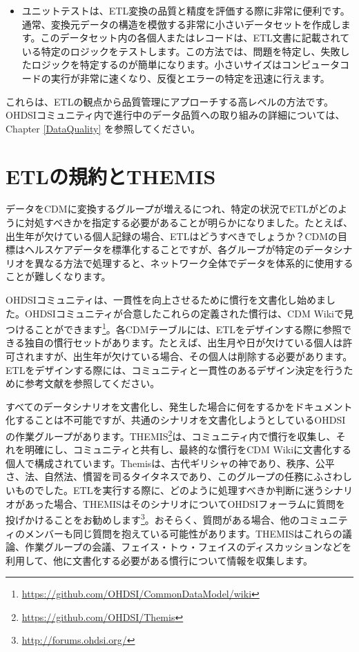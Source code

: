 \documentclass[
  11pt]{book}
\providecommand{\tightlist}{%
  \setlength{\itemsep}{0pt}\setlength{\parskip}{0pt}}
\theoremstyle{definition}
\theoremstyle{definition}
\theoremstyle{definition}
\theoremstyle{definition}
\theoremstyle{remark}
\begin{document}
\begin{itemize}
  \begin{itemize}
  \tightlist
  \item
    ユニットテストは、ETL変換の品質と精度を評価する際に非常に便利です。通常、変換元データの構造を模倣する非常に小さいデータセットを作成します。このデータセット内の各個人またはレコードは、ETL文書に記載されている特定のロジックをテストします。この方法では、問題を特定し、失敗したロジックを特定するのが簡単になります。小さいサイズはコンピュータコードの実行が非常に速くなり、反復とエラーの特定を迅速に行えます。
  \end{itemize}
\end{itemize}

これらは、ETLの観点から品質管理にアプローチする高レベルの方法です。OHDSIコミュニティ内で進行中のデータ品質への取り組みの詳細については、Chapter \ref{DataQuality} を参照してください。

\section{ETLの規約とTHEMIS}\label{etlux306eux898fux7d04ux3068themis}

データをCDMに変換するグループが増えるにつれ、特定の状況でETLがどのように対処すべきかを指定する必要があることが明らかになりました。たとえば、出生年が欠けている個人記録の場合、ETLはどうすべきでしょうか？CDMの目標はヘルスケアデータを標準化することですが、各グループが特定のデータシナリオを異なる方法で処理すると、ネットワーク全体でデータを体系的に使用することが難しくなります。

OHDSIコミュニティは、一貫性を向上させるために慣行を文書化し始めました。OHDSIコミュニティが合意したこれらの定義された慣行は、CDM Wikiで見つけることができます\footnote{\url{https://github.com/OHDSI/CommonDataModel/wiki}}。各CDMテーブルには、ETLをデザインする際に参照できる独自の慣行セットがあります。たとえば、出生月や日が欠けている個人は許可されますが、出生年が欠けている場合、その個人は削除する必要があります。ETLをデザインする際には、コミュニティと一貫性のあるデザイン決定を行うために参考文献を参照してください。

すべてのデータシナリオを文書化し、発生した場合に何をするかをドキュメント化することは不可能ですが、共通のシナリオを文書化しようとしているOHDSIの作業グループがあります。THEMIS\footnote{\url{https://github.com/OHDSI/Themis}}は、コミュニティ内で慣行を収集し、それを明確にし、コミュニティと共有し、最終的な慣行をCDM Wikiに文書化する個人で構成されています。Themisは、古代ギリシャの神であり、秩序、公平さ、法、自然法、慣習を司るタイタネスであり、このグループの任務にふさわしいものでした。ETLを実行する際に、どのように処理すべきか判断に迷うシナリオがあった場合、THEMISはそのシナリオについてOHDSIフォーラムに質問を投げかけることをお勧めします\footnote{\url{http://forums.ohdsi.org/}}。おそらく、質問がある場合、他のコミュニティのメンバーも同じ質問を抱えている可能性があります。THEMISはこれらの議論、作業グループの会議、フェイス・トゥ・フェイスのディスカッションなどを利用して、他に文書化する必要がある慣行について情報を収集します。
\end{document}
